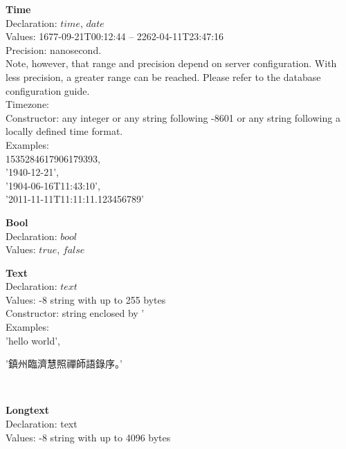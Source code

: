 \begin{minipage}{\textwidth}
\textbf{Time} \\
Declaration: $time$, $date$ \\
Values:   1677-09-21T00:12:44 --
          2262-04-11T23:47:16 \\
Precision: nanosecond. \\
Note, however, that range and precision depend on server configuration.
With less precision, a greater range can be reached.
Please refer to the database configuration guide. \\
Timezone:  \\
Constructor: any integer or any string following -8601 
or any string following a locally defined time format. \\
Examples:\\
1535284617906179393, \\
'1940-12-21', \\
'1904-06-16T11:43:10', \\
'2011-11-11T11:11:11.123456789'
\end{minipage}

\begin{minipage}{\textwidth}
\textbf{Bool} \\
Declaration: $bool$ \\
Values: $true$, $false$
\end{minipage}

\begin{minipage}{\textwidth}
\textbf{Text} \\
Declaration: $text$ \\
Values: -8 string with up to 255 bytes\\
Constructor: string enclosed by ' \\
Examples:\\
'hello world',\\
\begin{CJK}{UTF8}{gbsn}
'鎮州臨濟慧照禪師語錄序。' 
\end{CJK} \\
\end{minipage}

\begin{minipage}{\textwidth}
\textbf{Longtext} \\
Declaration: text \\
Values: -8 string with up to 4096 bytes\\
\end{minipage}

